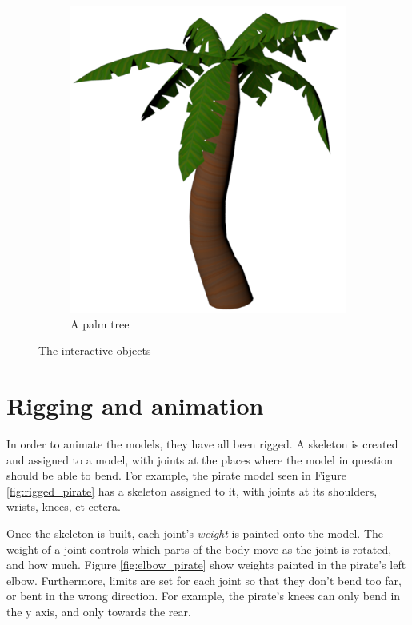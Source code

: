\begin{figure}[h!]
    \begin{subfigure}[b]{0.3\textwidth}
    	\centering
        \includegraphics[scale=0.2]{figures/PalmTree.png}\caption{A palm tree\label{fig:palmtree}}
    \end{subfigure}
\caption{The interactive objects}\label{fig:objects}
\end{figure}

\pagebreak
\section{Rigging and animation}
In order to animate the models, they have all been rigged. A skeleton is created and assigned to a model, with joints at the places where the model in question should be able to bend. For example, the pirate model seen in Figure \ref{fig:rigged_pirate} has a skeleton assigned to it, with joints at its shoulders, wrists, knees, et cetera.

Once the skeleton is built, each joint's \textit{weight} is painted onto the model. The weight of a joint controls which parts of the body move as the joint is rotated, and how much. Figure \ref{fig:elbow_pirate} show weights painted in the pirate's left elbow. Furthermore, limits are set for each joint so that they don't bend too far, or bent in the wrong direction. For example, the pirate's knees can only bend in the y axis, and only towards the rear.

